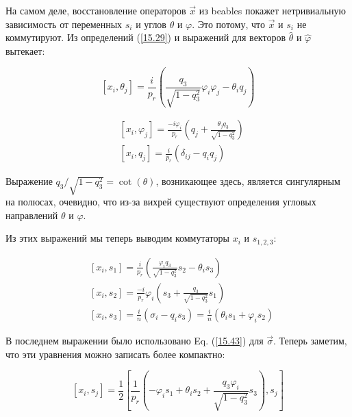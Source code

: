 \documentclass[main.tex]{subfiles}
\begin{document}
На самом деле, восстановление операторов $\vec x$ из beables покажет нетривиальную зависимость от переменных $s_i$ и углов $\theta$ и $\varphi$. Это потому, что $\vec x$ и $s_i$ не коммутируют. Из определений (\ref{15.29}) и выражений для векторов $\hat\theta$ и $\hat\varphi$ вытекает:

\begin{equation}\label{15.48}
	\left[x_{i}, \theta_{j}\right]=\frac{i}{p_{r}}\left(\frac{q_{3}}{\sqrt{1-q_{3}^{2}}} \varphi_{i} \varphi_{j}-\theta_{i} q_{j}\right)
\end{equation}

\begin{equation}\label{15.49}
	\begin{aligned}
&\left[x_{i}, \varphi_{j}\right]=\frac{-i \varphi_{i}}{p_{r}}\left(q_{j}+\frac{\theta_{j} q_{3}}{\sqrt{1-q_{3}^{2}}}\right)\\
&\left[x_{i}, q_{j}\right]=\frac{i}{p_{r}}\left(\delta_{i j}-q_{i} q_{j}\right)
\end{aligned}
\end{equation}

Выражение $q_3/ \sqrt{1 - q^2_3} = \cot (\theta)$, возникающее здесь, является сингулярным на полюсах, очевидно, что из-за вихрей существуют определения угловых направлений $\theta$ и $\varphi$.

Из этих выражений мы теперь выводим коммутаторы $x_i$ и $s_{1, 2, 3}$:

\begin{equation}\label{15.51}
	\begin{aligned}
&\left[x_{i}, s_{1}\right]=\frac{i}{p_{r}}\left(\frac{\varphi_{i} q_{3}}{\sqrt{1-q_{3}^{2}}} s_{2}-\theta_{i} s_{3}\right)\\
&\left[x_{i}, s_{2}\right]=\frac{-i}{p_{r}} \varphi_{i}\left(s_{3}+\frac{q_{3}}{\sqrt{1-q_{3}^{2}}} s_{1}\right)\\
&\left[x_{i}, s_{3}\right]=\frac{i}{n}\left(\sigma_{i}-q_{i} s_{3}\right)=\frac{i}{n}\left(\theta_{i} s_{1}+\varphi_{i} s_{2}\right)
\end{aligned}
\end{equation}

В последнем выражении было использовано Eq. (\ref{15.43}) для $\vec\sigma$. Теперь заметим, что эти уравнения можно записать более компактно:

\begin{equation}\label{15.54}
	\left[x_{i}, s_{j}\right]=\frac{1}{2}\left[\frac{1}{p_{r}}\left(-\varphi_{i} s_{1}+\theta_{i} s_{2}+\frac{q_{3} \varphi_{i}}{\sqrt{1-q_{3}^{2}}} s_{3}\right), s_{j}\right]
\end{equation}
\end{document}
